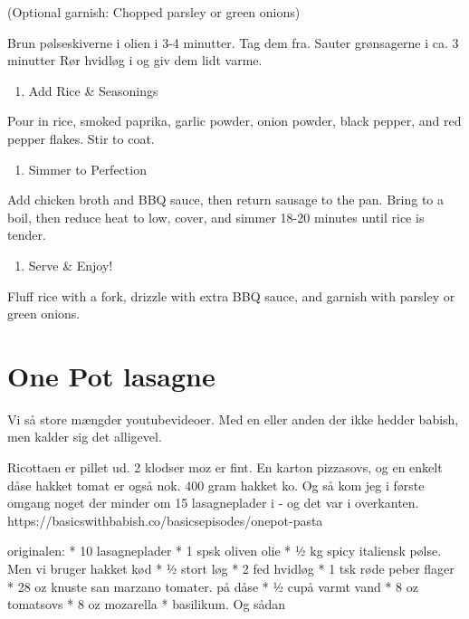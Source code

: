 \documentclass[
  letterpaper,
  DIV=11,
  numbers=noendperiod]{scrreprt}
\providecommand{\tightlist}{%
  \setlength{\itemsep}{0pt}\setlength{\parskip}{0pt}}\usepackage{longtable,booktabs,array}
\begin{document}
(Optional garnish: Chopped parsley or green onions)

Brun pølseskiverne i olien i 3-4 minutter. Tag dem fra. Sauter
grønsagerne i ca. 3 minutter Rør hvidløg i og giv dem lidt varme.

\begin{enumerate}
\def\labelenumi{\arabic{enumi}.}
\setcounter{enumi}{2}
\tightlist
\item
  Add Rice \& Seasonings
\end{enumerate}

Pour in rice, smoked paprika, garlic powder, onion powder, black pepper,
and red pepper flakes. Stir to coat.

\begin{enumerate}
\def\labelenumi{\arabic{enumi}.}
\setcounter{enumi}{3}
\tightlist
\item
  Simmer to Perfection
\end{enumerate}

Add chicken broth and BBQ sauce, then return sausage to the pan. Bring
to a boil, then reduce heat to low, cover, and simmer 18-20 minutes
until rice is tender.

\begin{enumerate}
\def\labelenumi{\arabic{enumi}.}
\setcounter{enumi}{4}
\tightlist
\item
  Serve \& Enjoy!
\end{enumerate}

Fluff rice with a fork, drizzle with extra BBQ sauce, and garnish with
parsley or green onions.

\hypertarget{one-pot-lasagne-1}{%
\section{One Pot lasagne}\label{one-pot-lasagne-1}}

Vi så store mængder youtubevideoer. Med en eller anden der ikke hedder
babish, men kalder sig det alligevel.

Ricottaen er pillet ud. 2 klodser moz er fint. En karton pizzasovs, og
en enkelt dåse hakket tomat er også nok. 400 gram hakket ko. Og så kom
jeg i første omgang noget der minder om 15 lasagneplader i - og det var
i overkanten. https://basicswithbabish.co/basicsepisodes/onepot-pasta

originalen: * 10 lasagneplader * 1 spsk oliven olie * ½ kg spicy
italiensk pølse. Men vi bruger hakket kød * ½ stort løg * 2 fed hvidløg
* 1 tsk røde peber flager * 28 oz knuste san marzano tomater. på dåse *
½ cupå varmt vand * 8 oz tomatsovs * 8 oz mozarella * basilikum. Og
sådan
\end{document}
